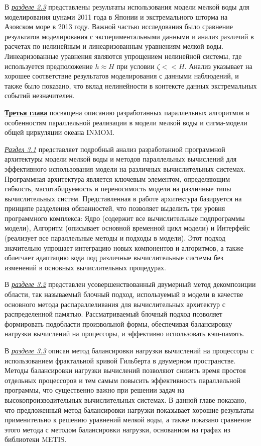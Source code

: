 В \underline{\textit{разделе 2.3}} представлены результаты использования модели мелкой воды для моделирования цунами 2011 года в Японии и экстремального шторма на Азовском море в 2013 году. Важной частью исследования было сравнение результатов моделирования с экспериментальными данными и анализ различий в расчетах по нелинейным и линеаризованным уравнениям мелкой воды. Линеаризованные уравнения являются упрощением нелинейной системы, где используется предположение $h \approx H$ при условии $\zeta << H$.
Анализ указывает на хорошее соответствие результатов моделирования с данными наблюдений, и также было показано, что вклад нелинейности в контексте данных экстремальных событий незначителен.

\underline{\textbf{Третья глава}} посвящена описанию разработанных параллельных алгоритмов и особенностям параллельной реализации в модели мелкой воды и сигма-модели общей циркуляции океана INMOM.

\underline{\textit{Раздел 3.1}} представляет подробный анализ разработанной программной архитектуры модели мелкой воды и методов параллельных вычислений для эффективного использования модели на различных вычислительных системах.
Программная архитектура является ключевым элементом, определяющим гибкость, масштабируемость и переносимость модели на различные типы вычислительных систем. Представленная в работе архитектура базируется на принципе разделения обязанностей, что позволяет выделить три уровня программного комплекса: Ядро (содержит все вычислительные подпрограммы модели), Алгоритм (описывает основной временной цикл модели) и Интерфейс (реализует все параллельные методы и подходы в модели).
Этот подход значительно упрощает интеграцию новых компонентов и алгоритмов, а также облегчает адаптацию кода под различные вычислительные системы без изменений в основных вычислительных процедурах.

В \underline{\textit{разделе 3.2}} представлен усовершенствованный двумерный метод декомпозиции области, так называемый блочный подход, используемый в модели в качестве основного метода распараллеливания для вычислительных архитектур с распределенной памятью.
Рассматриваемый блочный подход позволяет формировать подобласти произвольной формы, обеспечивая балансировку нагрузки вычислений на процессоры, и эффективно использовать кэш-память.

В \underline{\textit{разделе 3.3}} описан метод балансировки нагрузки вычислений на процессоры с использованием фрактальной кривой Гильберта в двумерном пространстве.
Методы балансировки нагрузки вычислений позволяют снизить время простоя отдельных процессоров и тем самым повысить эффективность параллельной программы, что существенно важно при решении задач на высокопроизводительных вычислительных системах.
В данной главе показано, что предложенный метод балансировки нагрузки показывает хорошие результаты применительно к решению уравнений мелкой воды, а также показано сравнение этого метода с методом балансировки нагрузки, основанном на графах из библиотеки METIS.

